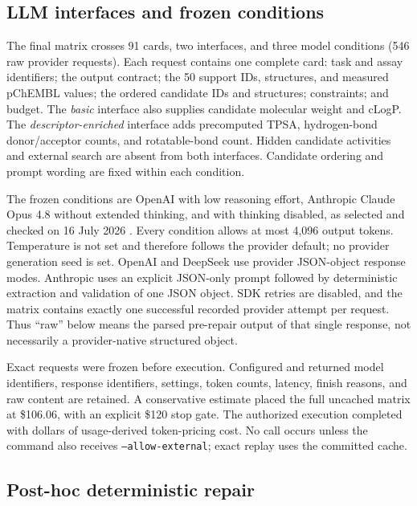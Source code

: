 \documentclass[10pt,a4paper]{article}
\begin{document}
\subsection{LLM interfaces and frozen conditions}

The final matrix crosses 91 cards, two interfaces, and three model conditions
(546 raw provider requests). Each request contains one complete card: task and
assay identifiers; the output contract; the 50 support IDs, structures, and
measured pChEMBL values; the ordered candidate IDs and structures; constraints;
and budget. The \emph{basic} interface also supplies candidate molecular weight
and cLogP. The \emph{descriptor-enriched} interface adds precomputed TPSA,
hydrogen-bond donor/acceptor counts, and rotatable-bond count. Hidden candidate
activities and external search are absent from both interfaces. Candidate
ordering and prompt wording are fixed within each condition.

The frozen conditions are OpenAI
 with low reasoning effort, Anthropic
Claude Opus 4.8 without extended thinking, and
 with thinking disabled, as selected and checked on 16
July 2026 \cite{openai2026gpt55,anthropic2026models,deepseek2026pricing}.
Every condition allows at most 4,096 output tokens. Temperature is not set and
therefore follows the provider default; no provider generation seed is set.
OpenAI and DeepSeek use provider JSON-object response modes. Anthropic uses an
explicit JSON-only prompt followed by deterministic extraction and validation
of one JSON object. SDK retries are disabled, and the matrix contains exactly
one successful recorded provider attempt per request. Thus ``raw'' below means
the parsed pre-repair output of that single response, not necessarily a
provider-native structured object.

Exact requests were frozen before execution. Configured and returned model
identifiers, response identifiers, settings, token counts, latency, finish
reasons, and raw content are retained. A conservative estimate placed the full
uncached matrix at \$106.06, with an explicit \$120 stop gate. The authorized
execution completed with \TotalLLMCost{} dollars of usage-derived token-pricing
cost. No call occurs unless the command also receives
\texttt{--allow-external}; exact replay uses the committed cache.

\subsection{Post-hoc deterministic repair}
\end{document}
